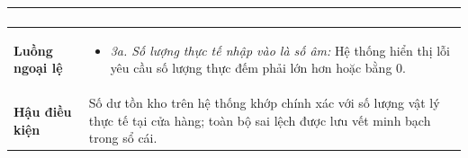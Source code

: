 \begin{table}[htbp]
\begin{tabularx}{\textwidth}{|l|X|}
\begin{enumerate}[leftmargin=*, nosep]
\end{enumerate} \\ \hline
\textbf{Luồng ngoại lệ} & 
\begin{itemize}[leftmargin=*, nosep]
    \item \textit{3a. Số lượng thực tế nhập vào là số âm:} Hệ thống hiển thị lỗi yêu cầu số lượng thực đếm phải lớn hơn hoặc bằng 0.
\end{itemize} \\ \hline
\textbf{Hậu điều kiện} & Số dư tồn kho trên hệ thống khớp chính xác với số lượng vật lý thực tế tại cửa hàng; toàn bộ sai lệch được lưu vết minh bạch trong sổ cái. \\ \hline
\end{tabularx}
\end{table}

